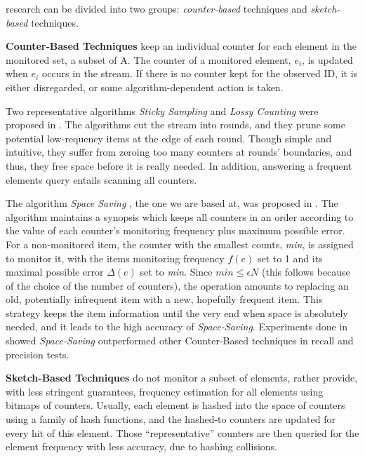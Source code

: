 \documentclass[conference]{IEEEtran}
\begin{document}
research can be divided into two groups: \emph{counter-based} techniques and \emph{sketch-based} techniques.\par

\textbf{Counter-Based Techniques} keep an individual counter for each element in the monitored set, a subset of A. The counter of a monitored element, $e_i$, is updated when $e_i$ occurs in the stream. If there is no counter kept for the observed ID, it is either disregarded, or some algorithm-dependent action is taken.\par

Two representative algorithms \emph{Sticky Sampling} and \emph{Lossy Counting} were proposed in \cite{IEEEexample:sticky}. The algorithms cut the stream into rounds, and they prune some potential low-requency items at the edge of each round. Though simple and intuitive, they suffer from zeroing too many counters at rounds’ boundaries, and thus, they free space before it is really needed. In addition, answering a frequent elements query entails scanning all counters.\par

The algorithm \emph{Space Saving} , the one we are based at, was proposed in \cite{IEEEexample:spacesaving}. The algorithm maintains a synopsis which keeps all counters in an order according to the value of each counter's monitoring frequency plus maximum possible error. For a non-monitored item, the counter with the smallest counts, \emph{min}, is assigned to monitor it, with the items monitoring frequency $f(e)$ set to 1 and its maximal possible error $\Delta(e)$ set to \emph{min}. Since $min\leq\epsilon N$ (this follows because of the choice of the number of counters), the operation amounts to replacing an old, potentially infrequent item with a new, hopefully frequent item. This strategy keeps the item information until the very end when space is absolutely needed, and it leads to the high accuracy of \emph{Space-Saving}. Experiments done in \cite{IEEEexample:overview_vldbj,IEEEexample:overview} showed \emph{Space-Saving} outperformed other Counter-Based techniques in recall and precision tests.\par

\textbf{Sketch-Based Techniques} do not monitor a subset of elements, rather provide, with less stringent guarantees, frequency estimation for all elements using bitmaps of counters. Usually, each element is hashed into the space of counters using a family of hash functions, and the hashed-to counters are updated for every hit of this element. Those “representative” counters are then queried for the element frequency with less accuracy, due to hashing collisions.\par
\end{document}
